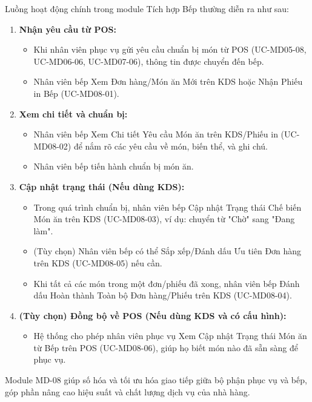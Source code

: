 \label{sssec:md08_overall_workflow}
Luồng hoạt động chính trong module Tích hợp Bếp thường diễn ra như sau:
\begin{enumerate}
    \item \textbf{Nhận yêu cầu từ POS:}
        \begin{itemize}
            \item Khi nhân viên phục vụ gửi yêu cầu chuẩn bị món từ POS (UC-MD05-08, UC-MD06-06, UC-MD07-06), thông tin được chuyển đến bếp.
            \item Nhân viên bếp Xem Đơn hàng/Món ăn Mới trên KDS hoặc Nhận Phiếu in Bếp (UC-MD08-01).
        \end{itemize}
    \item \textbf{Xem chi tiết và chuẩn bị:}
        \begin{itemize}
            \item Nhân viên bếp Xem Chi tiết Yêu cầu Món ăn trên KDS/Phiếu in (UC-MD08-02) để nắm rõ các yêu cầu về món, biến thể, và ghi chú.
            \item Nhân viên bếp tiến hành chuẩn bị món ăn.
        \end{itemize}
    \item \textbf{Cập nhật trạng thái (Nếu dùng KDS):}
        \begin{itemize}
            \item Trong quá trình chuẩn bị, nhân viên bếp Cập nhật Trạng thái Chế biến Món ăn trên KDS (UC-MD08-03), ví dụ: chuyển từ "Chờ" sang "Đang làm".
            \item (Tùy chọn) Nhân viên bếp có thể Sắp xếp/Đánh dấu Ưu tiên Đơn hàng trên KDS (UC-MD08-05) nếu cần.
            \item Khi tất cả các món trong một đơn/phiếu đã xong, nhân viên bếp Đánh dấu Hoàn thành Toàn bộ Đơn hàng/Phiếu trên KDS (UC-MD08-04).
        \end{itemize}
    \item \textbf{(Tùy chọn) Đồng bộ về POS (Nếu dùng KDS và có cấu hình):}
        \begin{itemize}
            \item Hệ thống cho phép nhân viên phục vụ Xem Cập nhật Trạng thái Món ăn từ Bếp trên POS (UC-MD08-06), giúp họ biết món nào đã sẵn sàng để phục vụ.
        \end{itemize}
\end{enumerate}
Module MD-08 giúp số hóa và tối ưu hóa giao tiếp giữa bộ phận phục vụ và bếp, góp phần nâng cao hiệu suất và chất lượng dịch vụ của nhà hàng.


